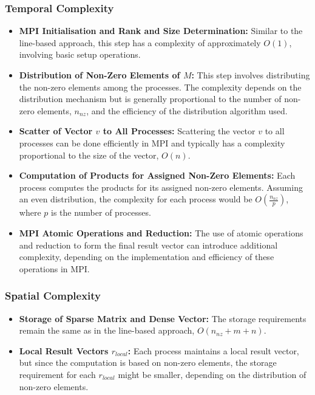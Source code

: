 \documentclass[12pt,oneside]{book} %
\begin{document}
\subsubsection{Temporal Complexity}
\begin{itemize}
    \item \textbf{MPI Initialisation and Rank and Size Determination:} Similar to the line-based approach, this step has a complexity of approximately \( O(1) \), involving basic setup operations.

    \item \textbf{Distribution of Non-Zero Elements of \( M \):} This step involves distributing the non-zero elements among the processes. The complexity depends on the distribution mechanism but is generally proportional to the number of non-zero elements, \( n_{nz} \), and the efficiency of the distribution algorithm used.

    \item \textbf{Scatter of Vector \( v \) to All Processes:} Scattering the vector \( v \) to all processes can be done efficiently in MPI and typically has a complexity proportional to the size of the vector, \( O(n) \).

    \item \textbf{Computation of Products for Assigned Non-Zero Elements:} Each process computes the products for its assigned non-zero elements. Assuming an even distribution, the complexity for each process would be \( O(\frac{n_{nz}}{p}) \), where \( p \) is the number of processes.

    \item \textbf{MPI Atomic Operations and Reduction:} The use of atomic operations and reduction to form the final result vector can introduce additional complexity, depending on the implementation and efficiency of these operations in MPI.
\end{itemize}

\subsubsection{Spatial Complexity}

\begin{itemize}
    \item \textbf{Storage of Sparse Matrix and Dense Vector:} The storage requirements remain the same as in the line-based approach, \( O(n_{nz} + m + n) \).

    \item \textbf{Local Result Vectors \( r_{local} \):} Each process maintains a local result vector, but since the computation is based on non-zero elements, the storage requirement for each \( r_{local} \) might be smaller, depending on the distribution of non-zero elements.
\end{itemize}
\end{document}
